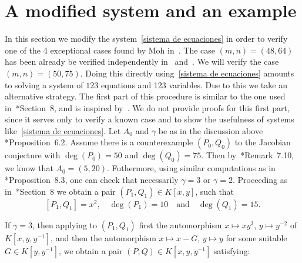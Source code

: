 \documentclass[reqno,a4paper]{amsart}
\theoremstyle{definition}
\theoremstyle{remark}
\begin{document}
\section{A modified system and an example}
%
In this section we modify the system~\eqref{sistema de ecuaciones} in order to verify
one of the 4 exceptional cases found by Moh in~\cite{M}. The case $(m,n)=(48,64)$ has
been already be verified independently in~\cite{H} and~\cite{GGV2}. We will verify the
case $(m,n)=(50,75)$. Doing this directly using~\eqref{sistema de ecuaciones} amounts
to solving a system of $123$ equations and 123 variables. Due to this we take  an
alternative strategy. The first part of this procedure is similar to the one used
in~\cite{GGV1}*{Section~8}, and is inspired by~\cite{M}. We do not provide proofs for
this first part, since it serves only to verify a known case and to show the usefulness
of systems like~\eqref{sistema de ecuaciones}. Let $A_0$ and $\gamma$ be as in the
discussion above \cite{GGV1}*{Proposition~6.2}. Assume there is a counterexample
$(P_0,Q_0)$ to the Jacobian conjecture with $\deg(P_0)=50$ and $\deg(Q_0)=75$.
Then by~\cite{GGV1}*{Remark~7.10}, we know that $A_0=(5,20)$. Futhermore, using
similar computations as in \cite{GGV1}*{Proposition~8.3}, one can check that
necessarily $\gamma=3$ or $\gamma=2$. Proceeding as in~\cite{GGV1}*{Section~8} we
obtain a pair $(P_1,Q_1)\in K[x,y]$, such that
$$
[P_1,Q_1]=x^2,\quad \deg(P_1)=10\quad\text{and}\quad \deg(Q_1)=15.
$$

If $\gamma=3$, then applying to $(P_1,Q_1)$ first the automorphism $x \mapsto xy^3$,
$y \mapsto y^{-2}$ of $K[x,y,y^{-1}]$, and then the automorphism $x\mapsto x-G$, $y\mapsto y$
for some suitable $G\in K[y,y^{-1}]$, we obtain a pair $(P,Q)\in K[x,y,y^{-1}]$ satisfying:
\end{document}
